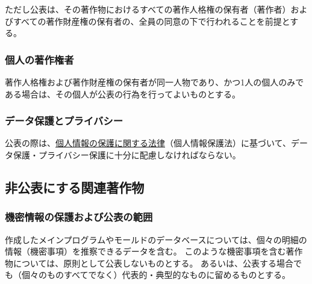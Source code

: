ただし公表は、その著作物におけるすべての著作人格権の保有者（著作者）およびすべての著作財産権の保有者の、全員の同意の下で行われることを前提とする。


\subsubsection{個人の著作権者\label{subsec:individualholder}}
著作人格権および著作財産権の保有者が同一人物であり、かつ1人の個人のみである場合は、その個人が公表の行為を行ってよいものとする。

\subsubsection{データ保護とプライバシー}
公表の際は、\href{https://elaws.e-gov.go.jp/document?lawid=415AC0000000057}{個人情報の保護に関する法律}（個人情報保護法）\cite{eGovPersonalInfoProtectionLaw}に基づいて、データ保護・プライバシー保護に十分に配慮しなければならない。


\subsection{非公表にする関連著作物}

\subsubsection{機密情報の保護および公表の範囲\label{subsec:notopenwork}}
作成したメインプログラムやモールドのデータベースについては、個々の明細の情報（機密事項）を推察できるデータを含む。
このような機密事項を含む著作物については、原則として公表しないものとする。
あるいは、公表する場合でも（個々のものすべてでなく）代表的・典型的なものに留めるものとする。


